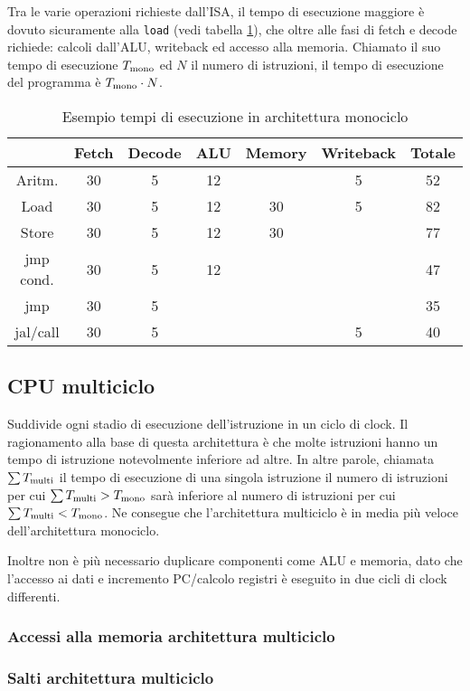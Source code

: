\documentclass[../ace.tex]{subfiles}
\begin{document}
Tra le varie operazioni richieste dall'ISA, il tempo di esecuzione maggiore è dovuto sicuramente alla \lstinline{load} (vedi
tabella \ref{tab:tempi_esecuzione_monociclo}),
che oltre alle fasi di fetch e decode richiede: calcoli dall'ALU, writeback ed accesso alla memoria.
Chiamato il suo tempo di esecuzione $T_\text{mono}$ ed $N$ il numero di istruzioni, il tempo di esecuzione del programma è $T_\text{mono} \cdot N$.

\begin{table}[t]
    \centering
    \begin{tabular}{|c|c|c|c|c|c|c|}
        \hline
    & Fetch  & Decode & ALU & Memory & Writeback & Totale \\
    \hline
        Aritm.   & 30 & 5 &  12 &        &         5 &      52\\
        Load     & 30 & 5 &  12 &     30 &         5 &      82\\
        Store    & 30 & 5 &  12 &     30 &           &      77\\
        jmp cond.& 30 & 5 &  12 &        &           &      47\\
        jmp      & 30 & 5 &     &        &           &      35\\
        jal/call & 30 & 5 &     &        &         5 &      40\\
        \hline
    \end{tabular}
    \caption{Esempio tempi di esecuzione in architettura monociclo}
    \label{tab:tempi_esecuzione_monociclo}
\end{table}

\subsection{CPU multiciclo}
Suddivide ogni stadio di esecuzione dell'istruzione in un ciclo di clock.
Il ragionamento alla base di questa architettura è che molte istruzioni hanno un tempo di istruzione notevolmente inferiore ad altre.
In altre parole, chiamata $\sum T_\text{multi}$ il tempo di esecuzione di una singola istruzione il numero di istruzioni per cui
$\sum T_\text{multi} > T_\text{mono}$ sarà inferiore al numero di istruzioni per cui $\sum T_\text{multi} < T_\text{mono}$.
Ne consegue che l'architettura multiciclo è in media più veloce dell'architettura monociclo.

Inoltre non è più necessario duplicare componenti come ALU e memoria, dato che l'accesso ai dati e incremento PC/calcolo registri è
eseguito in due cicli di clock differenti.
\subsubsection{Accessi alla memoria architettura multiciclo}
\subsubsection{Salti architettura multiciclo}
\end{document}

